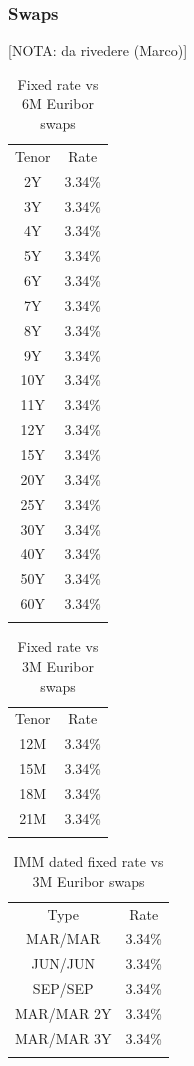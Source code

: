 \documentclass[11pt,reqno]{amsart}
\begin{document}
\subsubsection{\label{SecSwap}Swaps}
[NOTA: da rivedere (Marco)]
\begin{table}[tbp]
\label{tab:swaps6M}
\begin{tabular}{cc}
Tenor & Rate \\
2Y  & 3.34\% \\
3Y  & 3.34\% \\
4Y  & 3.34\% \\
5Y  & 3.34\% \\
6Y  & 3.34\% \\
7Y  & 3.34\% \\
8Y  & 3.34\% \\
9Y  & 3.34\% \\
10Y & 3.34\% \\
11Y & 3.34\% \\
12Y & 3.34\% \\
15Y & 3.34\% \\
20Y & 3.34\% \\
25Y & 3.34\% \\
30Y & 3.34\% \\
40Y & 3.34\% \\
50Y & 3.34\% \\
60Y & 3.34\% \\
&
\end{tabular}%
\caption{Fixed rate vs 6M Euribor swaps}
\end{table}

\begin{table}[tbp]
\label{tab:swaps3M}
\begin{tabular}{cc}
Tenor & Rate \\
12M & 3.34\% \\
15M & 3.34\% \\
18M & 3.34\% \\
21M & 3.34\% \\
&
\end{tabular}%
\caption{Fixed rate vs 3M Euribor swaps}
\end{table}

\begin{table}[tbp]
\label{tab:swapsIMM}
\begin{tabular}{cc}
Type & Rate \\
MAR/MAR & 3.34\% \\
JUN/JUN & 3.34\% \\
SEP/SEP & 3.34\% \\
MAR/MAR 2Y & 3.34\% \\
MAR/MAR 3Y & 3.34\% \\
&
\end{tabular}%
\caption{IMM dated fixed rate vs 3M Euribor swaps}
\end{table}
\end{document}
